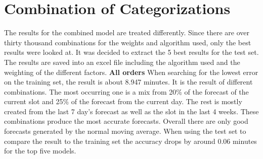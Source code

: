 \section{Combination of Categorizations}\label{section:Combination of Categorizations}
The results for the combined model are treated differently. Since there are over thirty thousand combinations for the weights and algorithm used, only the best results were looked at. It was decided to extract the 5 best results for the test set. The results are saved into an excel file including the algorithm used and the weighting of the different factors.
\newline\newline\textbf{All orders}\newline
When searching for the lowest error on the training set, the result is about 8.947 minutes. It is the result of different combinations. The most occurring one is a mix from 20\% of the forecast of the current slot and 25\% of the forecast from the current day. The rest is mostly created from the last 7 day’s forecast as well as the slot in the last 4 weeks. These combinations produce the most accurate forecasts. Overall there are only good forecasts generated by the normal moving average. When using the test set to compare the result to the training set the accuracy drops by around 0.06 minutes for the top five models.
